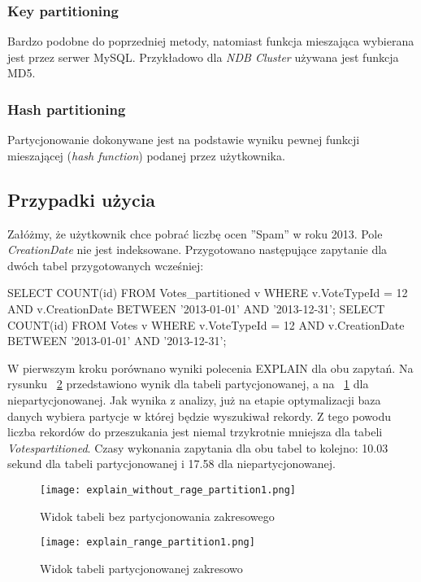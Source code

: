 \subsubsection{Key partitioning}
Bardzo podobne do poprzedniej metody, natomiast funkcja mieszająca wybierana jest przez serwer MySQL. Przykładowo dla \textit{NDB Cluster} używana jest funkcja MD5.
\subsubsection{Hash partitioning}
Partycjonowanie dokonywane jest na podstawie wyniku pewnej funkcji mieszającej (\textit{hash function}) podanej przez użytkownika.

\subsection{Przypadki użycia}
Załóżmy, że użytkownik chce pobrać liczbę ocen ''Spam'' w roku 2013. Pole \textit{CreationDate} nie jest indeksowane. Przygotowano następujące zapytanie dla dwóch tabel przygotowanych wcześniej:
\begin{spverbatim}
	SELECT COUNT(id) FROM Votes_partitioned v WHERE v.VoteTypeId = 12 AND v.CreationDate BETWEEN '2013-01-01' AND '2013-12-31'; 
	SELECT COUNT(id) FROM Votes v WHERE v.VoteTypeId = 12 AND
	v.CreationDate BETWEEN '2013-01-01' AND '2013-12-31';
\end{spverbatim}
\bigskip
W pierwszym kroku porównano wyniki polecenia EXPLAIN dla obu zapytań. Na rysunku ~\ref{fig:explain_range_partition1} przedstawiono wynik dla tabeli partycjonowanej, a na ~\ref{fig:explain_without_rage_partition1} dla niepartycjonowanej. Jak wynika z analizy, już na etapie optymalizacji baza danych wybiera partycje w której będzie wyszukiwał rekordy. Z tego powodu liczba rekordów do przeszukania jest niemal trzykrotnie mniejsza dla tabeli \textit{Votes\textunderscore partitioned}. Czasy wykonania zapytania dla obu tabel to kolejno: 10.03 sekund dla tabeli partycjonowanej i 17.58 dla niepartycjonowanej.
\begin{figure}
	\centering
	\texttt{[image: explain\_without\_rage\_partition1.png]}
	\caption{Widok tabeli bez partycjonowania zakresowego}
	\label{fig:explain_without_rage_partition1}
\end{figure}
\begin{figure}
	\centering
	\texttt{[image: explain\_range\_partition1.png]}
	\caption{Widok tabeli partycjonowanej zakresowo}
	\label{fig:explain_range_partition1}
\end{figure}

